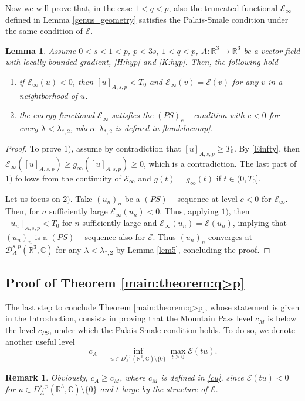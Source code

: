 \documentclass[leqno,11pt]{amsart}
\newcommand{\R}{\mathbb R}
\newcommand{\CC}{\mathbb C}
\newcommand{\C}{\mathbb C}
\newcommand{\cE}{{\mathcal E}}
\newcommand{\cD}{{\mathcal D}}
\numberwithin{equation}{section}
\newtheorem{lemma}[theorem]{Lemma}
\newtheorem{remark}[theorem]{Remark}
\begin{document}
Now we will prove that, in the case $1<q<p$, also the truncated functional $\cE_\infty$ defined in Lemma \ref{genus_geometry} satisfies the Palais-Smale condition under the same condition of $\cE$.

\begin{lemma}\label{compeinf}
Assume $0<s<1<p$, $p<3s$, $1<q < p$, $A:\R^3 \to \R^3$ be a vector field with locally bounded gradient, \eqref{H:hyp} and \eqref{K:hyp}. Then, the following hold
\begin{enumerate}[label=\arabic*)]
    \item if $\cE_\infty(u)<0$, then $[u]_{A,s,p}<T_0$ and $\cE_\infty(v)=\cE(v)$ for any $v$ in a neightborhood of $u$.
    \item the energy functional $\cE_\infty$ satisfies the $(PS)_c-$condition  with $c<0$ for every $\lambda<\lambda_{*,2}$, where $\lambda_{*,2}$ is defined in \eqref{lambdacomp}.
\end{enumerate}
\end{lemma}


\begin{proof}
To prove $1)$, assume by contradiction that $[u]_{A,s,p}\ge T_0$. By \eqref{Einfty}, then $\cE_\infty([u]_{A,s,p})\ge g_\infty([u]_{A,s,p})\ge 0$, which is a contradiction. The last part of $1)$ follows from the continuity of $\cE_\infty$ and $g(t)= g_\infty(t)$ if $t\in(0,T_0]$.

Let us focus on $2)$. Take $(u_n)_n$ be a $(PS)-$sequence at level $c<0$ for $\cE_\infty$. Then, for $n$ sufficiently large $\cE_\infty(u_n)<0$. Thus, applying $1)$, then $[u_n]_{A,s,p}<T_0$ for $n$ sufficiently large and $\cE_\infty(u_n)=\cE(u_n)$, implying that $(u_n)_n$ is a $(PS)-$sequence also for $\cE$. Thus $(u_n)_n$ converges at $\cD^{s,p}_A(\R^3,\CC)$ for any $\lambda<\lambda_{*,2}$ by Lemma \ref{lem5}, concluding the proof.
\end{proof}


\subsection{Proof of Theorem \ref{main:theorem:q>p} }

The last step to conclude Theorem \ref{main:theorem:q>p}, whose statement is given in the Introduction, consists in proving that the Mountain Pass level $c_M$ is below the level $c_{PS}$, under which the Palais-Smale condition holds. To do so, we denote another useful level
\begin{equation}\label{clambda}
c_A = \inf_{u\in D^{s,p}_A(\R^3,\C)\setminus\{0\}} \max_{t\ge 0} \cE(tu).
\end{equation}
\begin{remark}\label{culambda}
Obviously, $c_A\geq c_M$, where $c_M$ is defined in \eqref{cu},
since $\cE(tu)<0$ for $u\in D^{s,p}_A(\R^3,\C)\setminus\{0\}$ and $t$ large by the structure of $\cE$.
\end{remark}
\end{document}
